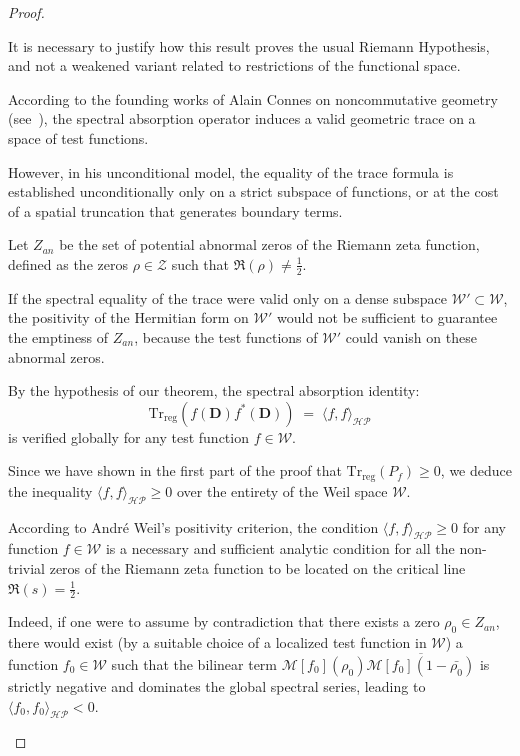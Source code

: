 \documentclass[Riemann_Hypothesis.tex]{subfiles}
\begin{document}
\begin{proof}
    \begin{part_proof}
        It is necessary to justify how this result proves the usual Riemann Hypothesis, and not a weakened variant related to restrictions of the functional space. \par
        According to the founding works of Alain Connes on noncommutative geometry (see~\cite{connes1999_trace_en}), the spectral absorption operator induces a valid geometric trace on a space of test functions. \par
        However, in his unconditional model, the equality of the trace formula is established unconditionally only on a strict subspace of functions, or at the cost of a spatial truncation that generates boundary terms. \par
        Let $Z_{an}$ be the set of potential abnormal zeros of the Riemann zeta function, defined as the zeros $\rho \in \mathcal{Z}$ such that $\Re(\rho) \neq \frac{1}{2}$. \par
        If the spectral equality of the trace were valid only on a dense subspace $\mathcal{W}' \subset \mathcal{W}$, the positivity of the Hermitian form on $\mathcal{W}'$ would not be sufficient to guarantee the emptiness of $Z_{an}$, because the test functions of $\mathcal{W}'$ could vanish on these abnormal zeros. \par
        By the hypothesis of our theorem, the spectral absorption identity:
        \begin{equation*}
            \mathrm{Tr}_{\mathrm{reg}}\left( f(\mathbf{D}) f^*(\mathbf{D}) \right) \;=\; \langle f, f \rangle_{\mathcal{HP}}
        \end{equation*}
        is verified globally for any test function $f \in \mathcal{W}$. \par
        Since we have shown in the first part of the proof that $\mathrm{Tr}_{\mathrm{reg}}\left( P_f \right) \ge 0$, we deduce the inequality $\langle f, f \rangle_{\mathcal{HP}} \ge 0$ over the entirety of the Weil space $\mathcal{W}$. \par
        According to André Weil's positivity criterion, the condition $\langle f, f \rangle_{\mathcal{HP}} \ge 0$ for any function $f \in \mathcal{W}$ is a necessary and sufficient analytic condition for all the non-trivial zeros of the Riemann zeta function to be located on the critical line $\Re(s) = \frac{1}{2}$. \par
        Indeed, if one were to assume by contradiction that there exists a zero $\rho_0 \in Z_{an}$, there would exist (by a suitable choice of a localized test function in $\mathcal{W}$) a function $f_0 \in \mathcal{W}$ such that the bilinear term $\mathcal{M}[f_0](\rho_0) \overline{\mathcal{M}[f_0](1-\bar{\rho_0})}$ is strictly negative and dominates the global spectral series, leading to $\langle f_0, f_0 \rangle_{\mathcal{HP}} < 0$. \par

\end{part_proof}
\end{proof}
\end{document}
